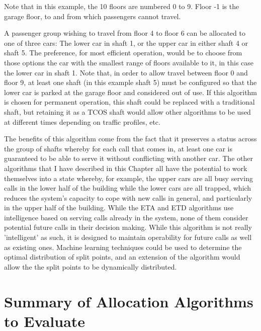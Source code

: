 \documentclass{UoYCSproject}
\begin{document}
Note that in this example, the 10 floors are numbered 0 to 9.  Floor -1 is the garage floor, to and from which passengers cannot travel.

A passenger group wishing to travel from floor 4 to floor 6 can be allocated to one of three cars: The lower car in shaft 1, or the upper car in either shaft 4 or shaft 5.  The preference, for most efficient operation, would be to choose from those options the car with the smallest range of floors available to it, in this case the lower car in shaft 1.  Note that, in order to allow travel between floor 0 and floor 9, at least one shaft (in this example shaft 5) must be configured so that the lower car is parked at the garage floor and considered out of use.  If this algorithm is chosen for permanent operation, this shaft could be replaced with a traditional shaft, but retaining it as a TCOS shaft would allow other algorithms to be used at different times depending on traffic profiles, etc.

The benefits of this algorithm come from the fact that it preserves a status across the group of shafts whereby for each call that comes in, at least one car is guaranteed to be able to serve it without conflicting with another car.  The other algorithms that I have described in this Chapter all have the potential to work themselves into a state whereby, for example, the upper cars are all busy serving calls in the lower half of the building while the lower cars are all trapped, which reduces the system's capacity to cope with new calls in general, and particularly in the upper half of the building.  While the ETA and ETD algorithms use intelligence based on serving calls already in the system, none of them consider potential future calls in their decision making.  While this algorithm is not really 'intelligent' as such, it is designed to maintain operability for future calls as well as existing ones.  Machine learning techniques could be used to determine the optimal distribution of split points, and an extension of the algorithm would allow the the split points to be dynamically distributed.

\section{Summary of Allocation Algorithms to Evaluate}
\label{algsummary}
\end{document}
